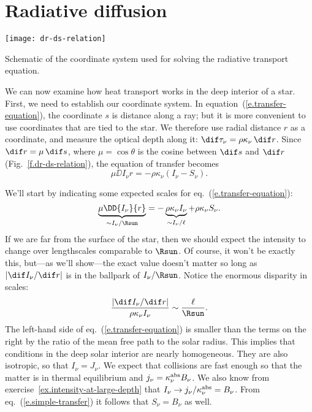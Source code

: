 \section{Radiative diffusion}\label{s.radiative-diffusion}

\begin{marginfigure}
\texttt{[image: dr-ds-relation]}
\caption[Coordinates for radiative transport equation]{\label{f.dr-ds-relation} Schematic of the coordinate system used for solving the radiative transport equation.}
\end{marginfigure}
We can now examine how heat transport works in the deep interior of a star. First, we need to establish our coordinate system. In equation~(\ref{e.transfer-equation}), the coordinate $s$ is distance along a ray; but it is more convenient to use coordinates that are tied to the star. We therefore use radial distance $r$ as a coordinate, and measure the optical depth along it: $\dif\tau_{\nu} = \rho\kappa_{\nu}\,\dif r$. 
Since $\dif r = \mu\,\dif s$, where $\mu=\cos\theta$ is the cosine between $\dif s$ and $\dif r$ (Fig.~\ref{f.dr-ds-relation}), the equation of transfer becomes
\begin{equation}
\mu\DD{I_{\nu}}{r} = -\rho\kappa_{\nu}\left(I_{\nu} - S_{\nu}\right).
\end{equation}

 We'll start by indicating some expected scales for eq.~(\ref{e.transfer-equation}):
\[
\underbrace{\mu\DD{I_{\nu}}{r}}_{\sim I_{\nu}/\Rsun} = -\underbrace{\rho\kappa_{\nu} I_{\nu}}_{\sim I_{\nu}/\ell}  +\rho\kappa_{\nu} S_{\nu}.
\]
If we are far from the surface of the star, then we should expect the intensity to change over lengthscales comparable to $\Rsun$. Of course, it won't be exactly this, but---as we'll show---the exact value doesn't matter so long as $|\dif I_{\nu}/\dif r|$ is in the ballpark of $I_{\nu}/\Rsun$. Notice the enormous disparity in scales:
\[
	\frac{|\dif I_{\nu}/\dif r|}{\rho\kappa_{\nu}I_{\nu}} \sim \frac{\ell}{\Rsun}.
\]
The left-hand side of eq.~(\ref{e.transfer-equation}) is smaller than the terms on the right by the ratio of the mean free path to the solar radius. This implies that conditions in the deep solar interior are nearly homogeneous. They are also isotropic, so that $I_{\nu} = J_{\nu}$. We expect that collisions are fast enough so that the matter is in thermal equilibrium and $j_{\nu} = \kappa_\nu^{\mathrm{abs}} B_{\nu}$. We also know from exercise~\ref{ex.intensity-at-large-depth} that $I_{\nu} \to j_{\nu}/\kappa_\nu^{\mathrm{abs}} = B_{\nu}$. From eq.~(\ref{e.simple-transfer}) it follows that $S_{\nu}= B_{\nu}$ as well.

